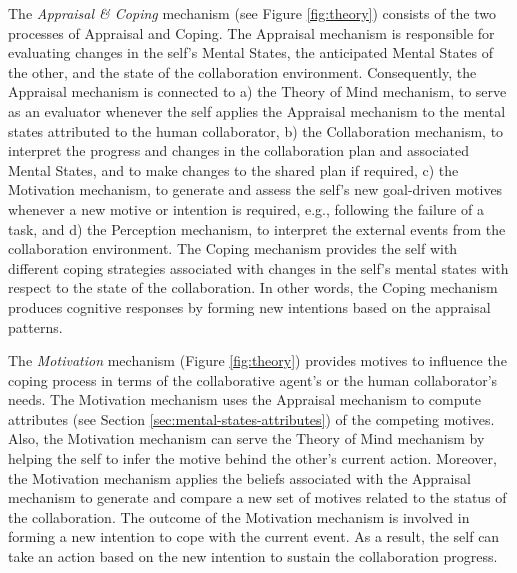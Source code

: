 \documentclass[12pt]{report}
\begin{document}
The \textit{Appraisal \& Coping} mechanism (see Figure \ref{fig:theory}) consists
of the two processes of Appraisal and Coping. The Appraisal mechanism is
responsible for evaluating changes in the self's Mental States, the anticipated
Mental States of the other, and the state of the collaboration environment.
Consequently, the Appraisal mechanism is connected to a) the Theory of Mind
mechanism, to serve as an evaluator whenever the self applies the Appraisal
mechanism to the mental states attributed to the human collaborator, b) the
Collaboration mechanism, to interpret the progress and changes in the
collaboration plan and associated Mental States, and to make changes to the
shared plan if required, c) the Motivation mechanism, to generate and assess the
self's new goal-driven motives whenever a new motive or intention is required,
e.g., following the failure of a task, and d) the Perception mechanism, to
interpret the external events from the collaboration environment. The Coping
mechanism provides the self with different coping strategies associated with
changes in the self's mental states with respect to the state of the
collaboration. In other words, the Coping mechanism produces cognitive responses
by forming new intentions based on the appraisal patterns.

The \textit{Motivation} mechanism (Figure \ref{fig:theory}) provides motives to
influence the coping process in terms of the collaborative agent's or the human
collaborator's needs. The Motivation mechanism uses the Appraisal mechanism to
compute attributes (see Section \ref{sec:mental-states-attributes}) of the
competing motives. Also, the Motivation mechanism can serve the Theory of Mind
mechanism by helping the self to infer the motive behind the other's current
action. Moreover, the Motivation mechanism applies the beliefs associated with
the Appraisal mechanism to generate and compare a new set of motives related to
the status of the collaboration. The outcome of the Motivation mechanism is
involved in forming a new intention to cope with the current event. As a result,
the self can take an action based on the new intention to sustain the
collaboration progress.
\end{document}
